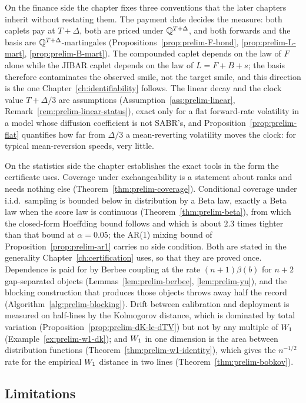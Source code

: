 \documentclass[../../../main.tex]{subfiles}
\begin{document}
On the finance side the chapter fixes three conventions that the later chapters inherit without restating them. The payment date decides the measure: both caplets pay at $T+\Delta$, both are priced under $\mathbb{Q}^{T+\Delta}$, and both forwards and the basis are $\mathbb{Q}^{T+\Delta}$-martingales (Propositions~\ref{prop:prelim-F-bond}, \ref{prop:prelim-L-mart}, \ref{prop:prelim-B-mart}). The compounded caplet depends on the law of $F$ alone while the JIBAR caplet depends on the law of $L=F+B+s$; the basis therefore contaminates the observed smile, not the target smile, and this direction is the one Chapter~\ref{ch:identifiability} follows. The linear decay and the clock value $T+\Delta/3$ are assumptions (Assumption~\ref{ass:prelim-linear}, Remark~\ref{rem:prelim-linear-status}), exact only for a flat forward-rate volatility in a model whose diffusion coefficient is not SABR's, and Proposition~\ref{prop:prelim-flat} quantifies how far from $\Delta/3$ a mean-reverting volatility moves the clock: for typical mean-reversion speeds, very little.

On the statistics side the chapter establishes the exact tools in the form the certificate uses. Coverage under exchangeability is a statement about ranks and needs nothing else (Theorem~\ref{thm:prelim-coverage}). Conditional coverage under i.i.d.\ sampling is bounded below in distribution by a Beta law, exactly a Beta law when the score law is continuous (Theorem~\ref{thm:prelim-beta}), from which the closed-form Hoeffding bound follows and which is about $2.3$ times tighter than that bound at $\alpha=0.05$; the AR(1) mixing bound of Proposition~\ref{prop:prelim-ar1} carries no side condition. Both are stated in the generality Chapter~\ref{ch:certification} uses, so that they are proved once. Dependence is paid for by Berbee coupling at the rate $(n+1)\beta(b)$ for $n+2$ gap-separated objects (Lemmas~\ref{lem:prelim-berbee}, \ref{lem:prelim-yu}), and the blocking construction that produces those objects throws away half the record (Algorithm~\ref{alg:prelim-blocking}). Drift between calibration and deployment is measured on half-lines by the Kolmogorov distance, which is dominated by total variation (Proposition~\ref{prop:prelim-dK-le-dTV}) but not by any multiple of $W_1$ (Example~\ref{ex:prelim-w1-dk}); and $W_1$ in one dimension is the area between distribution functions (Theorem~\ref{thm:prelim-w1-identity}), which gives the $n^{-1/2}$ rate for the empirical $W_1$ distance in two lines (Theorem~\ref{thm:prelim-bobkov}).

\subsection{Limitations}
\end{document}
